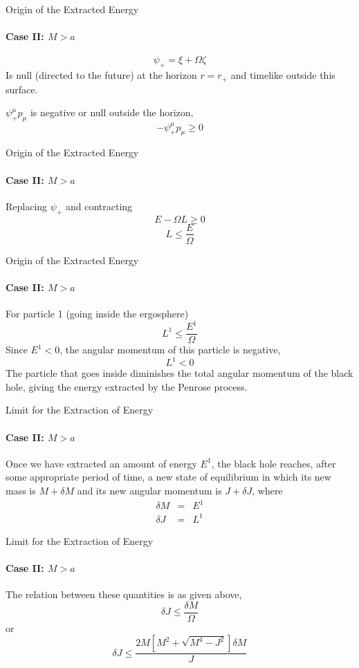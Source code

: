 \documentclass{beamer}
\begin{document}
     \begin{darkframes}
       
        \begin{frame}{Origin of the Extracted Energy}
       	\framesubtitle{Case II: $M>a$}
        $$\psi_{+}=\xi+\Omega\zeta$$
 		Is null (directed to the future) at the horizon $r=r_{+}$ and timelike outside this surface.
        \pause
        \bigskip
        
        $\psi_{+}^{\mu}p_{\mu}$ is negative or null outside the horizon,
        $$-\psi_{+}^{\mu}p_{\mu}\geq0$$
        \end{frame}
        
        \begin{frame}{Origin of the Extracted Energy}
       	\framesubtitle{Case II: $M>a$}
        Replacing $\psi_{+}$ and contracting
		$$E-\Omega L\geq0$$
        \pause
        $$L\leq\frac{E}{\Omega}$$
        \end{frame}
        
        \begin{frame}{Origin of the Extracted Energy}
       	\framesubtitle{Case II: $M>a$}
        For particle 1 (going inside the ergosphere)
        $$L^{1}\leq\frac{E^{1}}{\Omega}$$
        Since $E^{1}<0$, the angular momentum of this
particle is negative,
		$$L^{1}<0$$
        \pause
        The particle that goes inside diminishes the total angular momentum of the black hole, giving the energy extracted by the Penrose process.
        \end{frame}
        
        \begin{frame}{Limit for the Extraction of Energy}
       	\framesubtitle{Case II: $M>a$}
        Once we have extracted an amount of energy $E^{1}$, the black hole reaches, after some appropriate period of time, a new state of equilibrium in which its new mass is $M+\delta M$ and its new angular momentum is $J+\delta J$, where
        \begin{eqnarray*}
        \delta M & = & E^{1}\\
        \delta J & = & L^{1}
        \end{eqnarray*}
        \end{frame}
        
        \begin{frame}{Limit for the Extraction of Energy}
       	\framesubtitle{Case II: $M>a$}
        The relation between these quantities is as given above,
        $$\delta J\leq\frac{\delta M}{\Omega}$$
        \pause
        or
        $$\delta J\leq\frac{2M\left[M^{2}+\sqrt{M^{4}-J^{2}}\right]\delta M}{J}$$
        \end{frame}
        

\end{darkframes}
\end{document}
